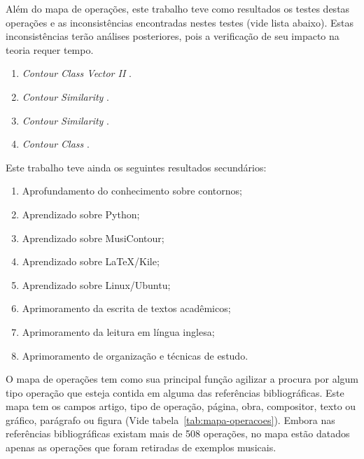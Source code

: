 \documentclass[11pt]{article}
\newcommand{\eng}[1]{\textit{#1}}
\begin{document}
Além do mapa de operações, este trabalho teve como resultados os
testes destas operações e as inconsistências encontradas nestes testes
(vide lista abaixo). Estas inconsistências terão análises posteriores,
pois a verificação de seu impacto na teoria requer tempo.

\begin{enumerate}
\item \eng{Contour Class Vector II} \cite[p. 241]{Friedmann1985}.
\item \eng{Contour Similarity} \cite[p. 242]{Quinn1997}.
\item \eng{Contour Similarity} \cite[p. 262]{Quinn1997}.
\item \eng{Contour Class} \cite[p. 113]{Schultz2008}.
\end{enumerate}

Este trabalho teve ainda os seguintes resultados secundários:

\begin{enumerate}
\item Aprofundamento do conhecimento sobre contornos;
\item Aprendizado sobre Python;
\item Aprendizado sobre MusiContour;
\item Aprendizado sobre \LaTeX/Kile;
\item Aprendizado sobre Linux/Ubuntu;
\item Aprimoramento da escrita de textos acadêmicos;
\item Aprimoramento da leitura em língua inglesa;
\item Aprimoramento de organização e técnicas de estudo.
\end{enumerate}

\label{sec:discussao}

O mapa de operações tem como sua principal função agilizar a procura
por algum tipo operação que esteja contida em alguma das referências
bibliográficas. Este mapa
tem os campos artigo, tipo de operação, página, obra,
compositor, texto ou gráfico, parágrafo ou figura (Vide
tabela~\ref{tab:mapa-operacoes}). Embora nas referências
bibliográficas existam mais de 508 operações, no mapa estão datados
apenas as operações que foram retiradas de exemplos musicais.
\end{document}
